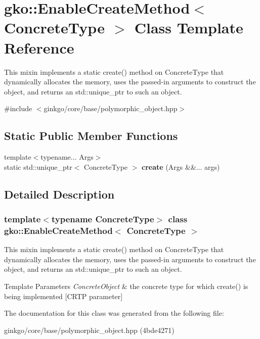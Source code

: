 \hypertarget{classgko_1_1EnableCreateMethod}{}\section{gko\+:\+:Enable\+Create\+Method$<$ Concrete\+Type $>$ Class Template Reference}
\label{classgko_1_1EnableCreateMethod}


This mixin implements a static {\ttfamily create()} method on {\ttfamily Concrete\+Type} that dynamically allocates the memory, uses the passed-\/in arguments to construct the object, and returns an std\+::unique\+\_\+ptr to such an object.  




{\ttfamily \#include $<$ginkgo/core/base/polymorphic\+\_\+object.\+hpp$>$}

\subsection*{Static Public Member Functions}
\begin{DoxyCompactItemize}
\item 
\mbox{\label{classgko_1_1EnableCreateMethod_aa732d4d8736a4ade9206b9641cd1edd5}} 
{\footnotesize template$<$typename... Args$>$ }\\static std\+::unique\+\_\+ptr$<$ Concrete\+Type $>$ {\bfseries create} (Args \&\&... args)
\end{DoxyCompactItemize}


\subsection{Detailed Description}
\subsubsection*{template$<$typename Concrete\+Type$>$\newline
class gko\+::\+Enable\+Create\+Method$<$ Concrete\+Type $>$}

This mixin implements a static {\ttfamily create()} method on {\ttfamily Concrete\+Type} that dynamically allocates the memory, uses the passed-\/in arguments to construct the object, and returns an std\+::unique\+\_\+ptr to such an object. 


\begin{DoxyTemplParams}{Template Parameters}
{\em Concrete\+Object} & the concrete type for which {\ttfamily create()} is being implemented \mbox{[}C\+R\+TP parameter\mbox{]} \\
\hline
\end{DoxyTemplParams}


The documentation for this class was generated from the following file\+:\begin{DoxyCompactItemize}
\item 
ginkgo/core/base/polymorphic\+\_\+object.\+hpp (4bde4271)\end{DoxyCompactItemize}
